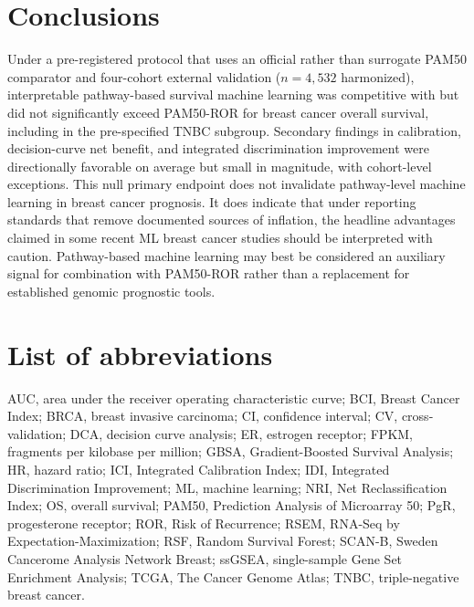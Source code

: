 \documentclass[11pt,letterpaper]{article}
\begin{document}

\section*{Conclusions}

Under a pre-registered protocol that uses an official rather than surrogate PAM50 comparator and four-cohort external validation ($n = 4{,}532$ harmonized), interpretable pathway-based survival machine learning was competitive with but did not significantly exceed PAM50-ROR for breast cancer overall survival, including in the pre-specified TNBC subgroup. Secondary findings in calibration, decision-curve net benefit, and integrated discrimination improvement were directionally favorable on average but small in magnitude, with cohort-level exceptions. This null primary endpoint does not invalidate pathway-level machine learning in breast cancer prognosis. It does indicate that under reporting standards that remove documented sources of inflation, the headline advantages claimed in some recent ML breast cancer studies should be interpreted with caution. Pathway-based machine learning may best be considered an auxiliary signal for combination with PAM50-ROR rather than a replacement for established genomic prognostic tools.


\section*{List of abbreviations}

AUC, area under the receiver operating characteristic curve; BCI, Breast Cancer Index; BRCA, breast invasive carcinoma; CI, confidence interval; CV, cross-validation; DCA, decision curve analysis; ER, estrogen receptor; FPKM, fragments per kilobase per million; GBSA, Gradient-Boosted Survival Analysis; HR, hazard ratio; ICI, Integrated Calibration Index; IDI, Integrated Discrimination Improvement; ML, machine learning; NRI, Net Reclassification Index; OS, overall survival; PAM50, Prediction Analysis of Microarray 50; PgR, progesterone receptor; ROR, Risk of Recurrence; RSEM, RNA-Seq by Expectation-Maximization; RSF, Random Survival Forest; SCAN-B, Sweden Cancerome Analysis Network Breast; ssGSEA, single-sample Gene Set Enrichment Analysis; TCGA, The Cancer Genome Atlas; TNBC, triple-negative breast cancer.
\end{document}
